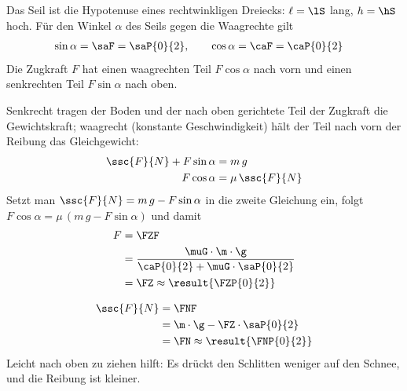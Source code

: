 Das Seil ist die Hypotenuse eines rechtwinkligen Dreiecks: $\ell = \lS$ lang, $h = \hS$ hoch. Für den Winkel $\alpha$ des Seils gegen die Waagrechte gilt
\begin{align}
 \sin\alpha &= \saF = \saP{0}{2}, \qquad \cos\alpha = \caF = \caP{0}{2}
\end{align}
Die Zugkraft $F$ hat einen waagrechten Teil $F\cos\alpha$ nach vorn und einen senkrechten Teil $F\sin\alpha$ nach oben.

\begin{center}
\end{center}

\begin{abcliste}
\abc
Senkrecht tragen der Boden und der nach oben gerichtete Teil der Zugkraft die Gewichtskraft; waagrecht (konstante Geschwindigkeit) hält der Teil nach vorn der Reibung das Gleichgewicht:
\begin{align}
 \ssc{F}{N} + F\sin\alpha &= m\,g \\
 F\cos\alpha &= \mu\,\ssc{F}{N}
\end{align}
Setzt man $\ssc{F}{N} = m\,g - F\sin\alpha$ in die zweite Gleichung ein, folgt $F\cos\alpha = \mu\,(m\,g - F\sin\alpha)$ und damit
\begin{align}
 F &= \FZF \\
   &= \frac{\muG\cdot\m\cdot\g}{\caP{0}{2}+\muG\cdot\saP{0}{2}} \\
   &= \FZ \approx \result{\FZP{0}{2}}
\end{align}

\abc
\begin{align}
 \ssc{F}{N} &= \FNF \\
   &= \m\cdot\g-\FZ\cdot\saP{0}{2} \\
   &= \FN \approx \result{\FNP{0}{2}}
\end{align}
Leicht nach oben zu ziehen hilft: Es drückt den Schlitten weniger auf den Schnee, und die Reibung ist kleiner.
\end{abcliste}

